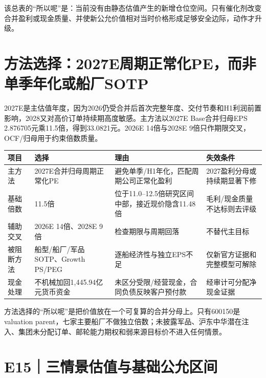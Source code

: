 该总表的“所以呢”是：当前没有由静态估值产生的新增仓位空间。只有催化剂改变合并盈利或现金质量、并使新公允价值相对当时价格形成足够安全边际，动作才升级。

\section{方法选择：2027E周期正常化PE，而非单季年化或船厂SOTP}

2027E是主估值年度，因为2026仍受合并后首次完整年度、交付节奏和H1利润前置影响，2028又对高价订单持续期高度敏感。主方法以2027E Base合并归母EPS 2.876705元乘11.5倍，得到33.0821元。2026E 14倍与2028E 9倍只作期限交叉，OCF/归母用于约束倍数质量。

\begin{exhibitbox}[估值方法与假设桥]
\small
\begin{tabularx}{\exhibitboxwidth}{L{3.0cm}L{4.0cm}L{3.8cm}X}
\toprule
\textbf{项目} & \textbf{选择} & \textbf{理由} & \textbf{失效条件} \\
\midrule
主方法 & 2027E合并归母周期正常化PE & 避免单季/H1年化，匹配周期公司正常化盈利 & 2027盈利分母或持续期显著下修 \\
基础倍数 & 11.5倍 & 位于11.0--12.5倍研究区间中部，接近现价隐含11.48倍 & 毛利/现金质量不达标则去评级 \\
辅助交叉 & 2026E 14倍、2028E 9倍 & 检查期限与周期回落 & 不替代主目标 \\
被阻断方法 & 船型/船厂/军品SOTP、Growth PS/PEG & 逐船经济性与独立EPS不足 & 仅新官方证据和完整模型可解除 \\
现金处理 & 不机械加回1,445.94亿元货币资金 & 未区分受限/经营现金，合同负债反映客户预付款 & 经审计可分配净现金证据 \\
\bottomrule
\end{tabularx}
\end{exhibitbox}

方法选择的“所以呢”是把价值放在一个可复算的合并分母上。只有600150是valuation parent，七家主要船厂不做独立倍数；未披露军品、沪东中华潜在注入、集团未分配订单、邮轮能力期权和弱来源目标价不进入任何情景。

\section{E15｜三情景估值与基础公允区间}

